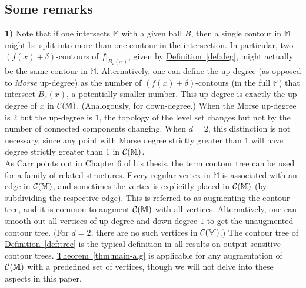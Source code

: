 \documentclass[11pt]{article}
\theoremstyle{definition}
\newcommand{\cC}{{\cal C}}
\newcommand{\MM}{\mathbb{M}}
\newcommand{\eps}{\varepsilon}
\newcommand{\Thm}[1]{\hyperref[thm:#1]{Theorem~\ref*{thm:#1}}} %
\newcommand{\Def}[1]{\hyperref[def:#1]{Definition~\ref*{def:#1}}} %
\newcommand{\reeb}{\cC}
\begin{document}
\subsection{Some remarks}
{\bf 1)}
Note that if one intersects $\MM$ with a given ball $B$, then a single contour in $\MM$ might be split into more than one contour in the intersection. 
In particular, two $(f(x)+\delta)$-contours of $f|_{B_\eps(x)}$, given by \Def{deg}, might actually be the same contour in $\MM$. 
Alternatively, one can define the up-degree (as opposed to \emph{Morse} up-degree) as the number of $(f(x)+\delta)$-contours (in the full $\MM$)
that intersect $B_\eps(x)$, a potentially smaller number. This up-degree
is exactly the up-degree of $x$ in $\reeb(\MM)$. (Analogously, for down-degree.)
When the Morse up-degree is $2$ but the up-degree is $1$, the topology of the level set changes but not by the number of connected components changing.
When $d=2$, this distinction is not necessary, since any point with Morse degree strictly greater than $1$ will have degree strictly greater than $1$ in $\reeb(\MM)$.\\

As Carr points out in Chapter 6 of his thesis, the term contour tree can be used for a family of related structures.
Every regular vertex in $\MM$ is associated with an edge in $\reeb(\MM)$, and sometimes the
vertex is explicitly placed in $\reeb(\MM)$ (by subdividing the respective edge). This is referred
to as augmenting the contour tree, and it is common to augment $\reeb(\MM)$ with all vertices.
Alternatively, one can smooth out all vertices of up-degree and down-degree $1$ to get the
unaugmented contour tree. (For $d=2$, there are no such vertices in $\reeb(\MM)$.) 
The contour tree of \Def{tree} is the typical definition in all results on output-sensitive
contour trees.
\Thm{main-alg} is applicable for any augmentation of $\reeb(\MM)$ with a predefined
set of vertices, though we will not delve into these aspects in this paper.


\end{document}
